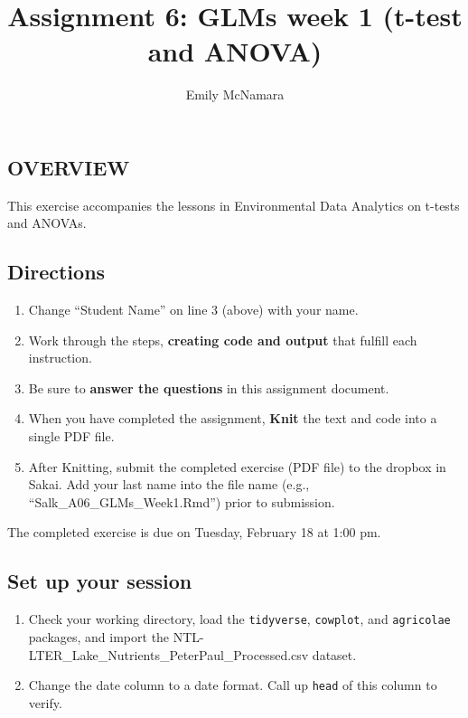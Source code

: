 \documentclass[]{article}
\title{Assignment 6: GLMs week 1 (t-test and ANOVA)}
\author{Emily McNamara}
\date{}
\providecommand{\tightlist}{%
  \setlength{\itemsep}{0pt}\setlength{\parskip}{0pt}}
\begin{document}
\maketitle

\subsection{OVERVIEW}\label{overview}

This exercise accompanies the lessons in Environmental Data Analytics on
t-tests and ANOVAs.

\subsection{Directions}\label{directions}

\begin{enumerate}
\def\labelenumi{\arabic{enumi}.}
\tightlist
\item
  Change ``Student Name'' on line 3 (above) with your name.
\item
  Work through the steps, \textbf{creating code and output} that fulfill
  each instruction.
\item
  Be sure to \textbf{answer the questions} in this assignment document.
\item
  When you have completed the assignment, \textbf{Knit} the text and
  code into a single PDF file.
\item
  After Knitting, submit the completed exercise (PDF file) to the
  dropbox in Sakai. Add your last name into the file name (e.g.,
  ``Salk\_A06\_GLMs\_Week1.Rmd'') prior to submission.
\end{enumerate}

The completed exercise is due on Tuesday, February 18 at 1:00 pm.

\subsection{Set up your session}\label{set-up-your-session}

\begin{enumerate}
\def\labelenumi{\arabic{enumi}.}
\item
  Check your working directory, load the \texttt{tidyverse},
  \texttt{cowplot}, and \texttt{agricolae} packages, and import the
  NTL-LTER\_Lake\_Nutrients\_PeterPaul\_Processed.csv dataset.
\item
  Change the date column to a date format. Call up \texttt{head} of this
  column to verify.
\end{enumerate}
\end{document}
